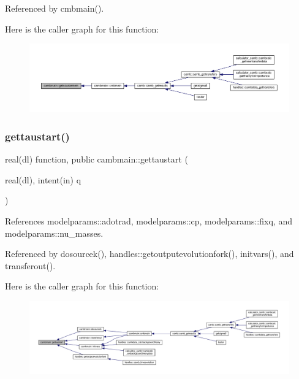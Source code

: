 Referenced by cmbmain().

Here is the caller graph for this function\+:
\nopagebreak
\begin{figure}[H]
\begin{center}
\leavevmode
\includegraphics[width=350pt]{namespacecambmain_af7f170a39e21214fe3b389f74dbb183d_icgraph}
\end{center}
\end{figure}
\mbox{\label{namespacecambmain_affb3c10eee60a6f657ccf1c0f0abd693}} 
\subsubsection{\texorpdfstring{gettaustart()}{gettaustart()}}
{\footnotesize\ttfamily real(dl) function, public cambmain\+::gettaustart (\begin{DoxyParamCaption}\item[{real(dl), intent(in)}]{q }\end{DoxyParamCaption})}



References modelparams\+::adotrad, modelparams\+::cp, modelparams\+::fixq, and modelparams\+::nu\+\_\+masses.



Referenced by dosourcek(), handles\+::getoutputevolutionfork(), initvars(), and transferout().

Here is the caller graph for this function\+:
\nopagebreak
\begin{figure}[H]
\begin{center}
\leavevmode
\includegraphics[width=350pt]{namespacecambmain_affb3c10eee60a6f657ccf1c0f0abd693_icgraph}
\end{center}
\end{figure}
\mbox{\label{namespacecambmain_ac9e5e052a53e579f43f980836baee5be}} 
